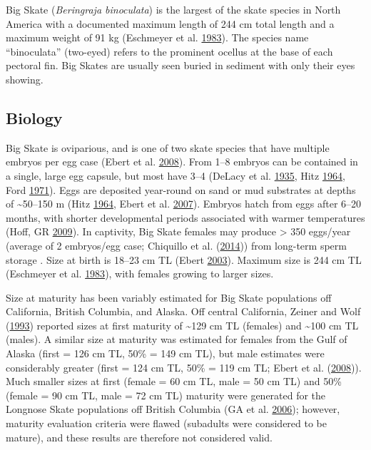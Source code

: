 \documentclass[12pt,]{article}
\begin{document}
Big Skate (\emph{Beringraja binoculata}) is the largest of the skate
species in North America with a documented maximum length of 244 cm
total length and a maximum weight of 91 kg (Eschmeyer et al.
\protect\hyperlink{ref-Eschmeyer1983}{1983}). The species name
``binoculata'' (two-eyed) refers to the prominent ocellus at the base of
each pectoral fin. Big Skates are usually seen buried in sediment with
only their eyes showing.

\hypertarget{biology}{%
\subsection{Biology}\label{biology}}

Big Skate is oviparious, and is one of two skate species that have
multiple embryos per egg case (Ebert et al.
\protect\hyperlink{ref-Ebert2008}{2008}). From 1--8 embryos can be
contained in a single, large egg capsule, but most have 3--4 (DeLacy et
al. \protect\hyperlink{ref-DeLacy1935}{1935}, Hitz
\protect\hyperlink{ref-Hitz1964}{1964}, Ford
\protect\hyperlink{ref-Ford1971}{1971}). Eggs are deposited year-round
on sand or mud substrates at depths of \textasciitilde{}50--150 m (Hitz
\protect\hyperlink{ref-Hitz1964}{1964}, Ebert et al.
\protect\hyperlink{ref-Ebert2007}{2007}). Embryos hatch from eggs after
6--20 months, with shorter developmental periods associated with warmer
temperatures (Hoff, GR \protect\hyperlink{ref-Hoff2009}{2009}). In
captivity, Big Skate females may produce \textgreater{} 350 eggs/year
(average of 2 embryos/egg case; Chiquillo et al.
(\protect\hyperlink{ref-Chiquillo2014}{2014})) from long-term sperm
storage . Size at birth is 18--23 cm TL (Ebert
\protect\hyperlink{ref-Ebert2003}{2003}). Maximum size is 244 cm TL
(Eschmeyer et al. \protect\hyperlink{ref-Eschmeyer1983}{1983}), with
females growing to larger sizes.

Size at maturity has been variably estimated for Big Skate populations
off California, British Columbia, and Alaska. Off central California,
Zeiner and Wolf (\protect\hyperlink{ref-ZeinerWolf1993}{1993}) reported
sizes at first maturity of \textasciitilde{}129 cm TL (females) and
\textasciitilde{}100 cm TL (males). A similar size at maturity was
estimated for females from the Gulf of Alaska (first = 126 cm TL, 50\% =
149 cm TL), but male estimates were considerably greater (first = 124 cm
TL, 50\% = 119 cm TL; Ebert et al.
(\protect\hyperlink{ref-Ebert2008}{2008})). Much smaller sizes at first
(female = 60 cm TL, male = 50 cm TL) and 50\% (female = 90 cm TL, male =
72 cm TL) maturity were generated for the Longnose Skate populations off
British Columbia (GA et al.
\protect\hyperlink{ref-McFandKing2006}{2006}); however, maturity
evaluation criteria were flawed (subadults were considered to be
mature), and these results are therefore not considered valid.
\end{document}

